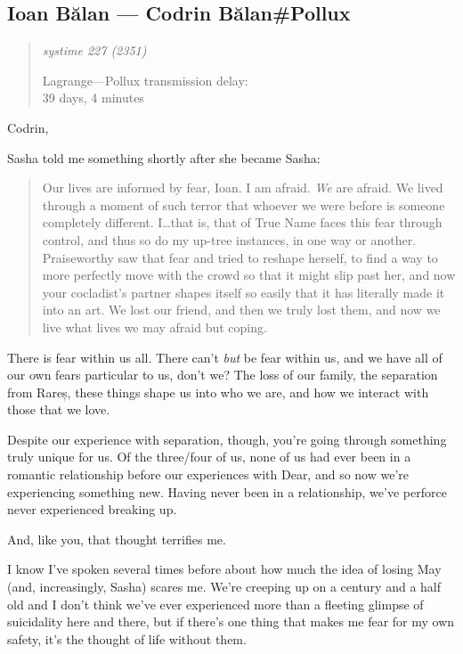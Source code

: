 \hypertarget{ioan-bux103lan-codrin-bux103lanpollux}{%
\subsection{Ioan Bălan — Codrin Bălan\#Pollux}\label{ioan-bux103lan-codrin-bux103lanpollux}}

\begin{quote}
\itshape
systime 227 (2351)

Lagrange---Pollux transmission delay:\\
39 days, 4 minutes
\end{quote}

Codrin,

Sasha told me something shortly after she became Sasha:

\begin{quote}
Our lives are informed by fear, Ioan. I am afraid. \emph{We} are afraid. We lived through a moment of such terror that whoever we were before is someone completely different. I\ldots that is, that of True Name faces this fear through control, and thus so do my up-tree instances, in one way or another. Praiseworthy saw that fear and tried to reshape herself, to find a way to more perfectly move with the crowd so that it might slip past her, and now your cocladist's partner shapes itself so easily that it has literally made it into an art. We lost our friend, and then we truly lost them, and now we live what lives we may afraid but coping.
\end{quote}

There is fear within us all. There can't \emph{but} be fear within us, and we have all of our own fears particular to us, don't we? The loss of our family, the separation from Rareș, these things shape us into who we are, and how we interact with those that we love.

Despite our experience with separation, though, you're going through something truly unique for us. Of the three/four of us, none of us had ever been in a romantic relationship before our experiences with Dear, and so now we're experiencing something new. Having never been in a relationship, we've perforce never experienced breaking up.

And, like you, that thought terrifies me.

I know I've spoken several times before about how much the idea of losing May (and, increasingly, Sasha) scares me. We're creeping up on a century and a half old and I don't think we've ever experienced more than a fleeting glimpse of suicidality here and there, but if there's one thing that makes me fear for my own safety, it's the thought of life without them.

